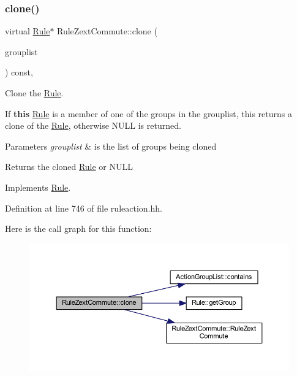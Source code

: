 \subsubsection{\texorpdfstring{clone()}{clone()}}
{\footnotesize\ttfamily virtual \mbox{\hyperlink{class_rule}{Rule}}$\ast$ Rule\+Zext\+Commute\+::clone (\begin{DoxyParamCaption}\item[{const \mbox{\hyperlink{class_action_group_list}{Action\+Group\+List}} \&}]{grouplist }\end{DoxyParamCaption}) const\hspace{0.3cm}{\ttfamily [inline]}, {\ttfamily [virtual]}}



Clone the \mbox{\hyperlink{class_rule}{Rule}}. 

If {\bfseries{this}} \mbox{\hyperlink{class_rule}{Rule}} is a member of one of the groups in the grouplist, this returns a clone of the \mbox{\hyperlink{class_rule}{Rule}}, otherwise N\+U\+LL is returned. 
\begin{DoxyParams}{Parameters}
{\em grouplist} & is the list of groups being cloned \\
\hline
\end{DoxyParams}
\begin{DoxyReturn}{Returns}
the cloned \mbox{\hyperlink{class_rule}{Rule}} or N\+U\+LL 
\end{DoxyReturn}


Implements \mbox{\hyperlink{class_rule_a70de90a76461bfa7ea0b575ce3c11e4d}{Rule}}.



Definition at line 746 of file ruleaction.\+hh.

Here is the call graph for this function\+:
\nopagebreak
\begin{figure}[H]
\begin{center}
\leavevmode
\includegraphics[width=350pt]{class_rule_zext_commute_ac52fb507925d6fb14b3138b567dfee6f_cgraph}
\end{center}
\end{figure}
\mbox{\label{class_rule_zext_commute_aa3f394cbabb17383c580749e0c32d8de}} 
